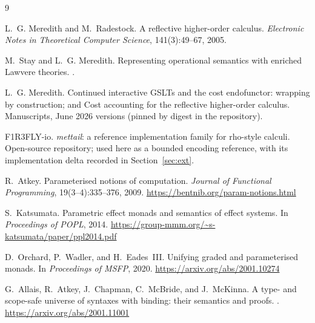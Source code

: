 \documentclass[11pt]{article}
\begin{document}
\begin{thebibliography}{9}

L.~G. Meredith and M.~Radestock.
\newblock A reflective higher-order calculus.
\newblock \emph{Electronic Notes in Theoretical Computer Science},
  141(3):49--67, 2005.

M.~Stay and L.~G. Meredith.
\newblock Representing operational semantics with enriched Lawvere
  theories.
.

L.~G. Meredith.
\newblock Continued interactive GSLTs and the cost endofunctor: wrapping
  by construction; and Cost accounting for the reflective higher-order
  calculus.
\newblock Manuscripts, June 2026 versions (pinned by digest in the
  repository).

F1R3FLY-io.
\newblock \emph{mettail}: a reference implementation family for
  rho-style calculi.
\newblock Open-source repository; used here as a bounded encoding
reference, with its implementation delta recorded in
Section~\ref{sec:ext}.

R.~Atkey.
\newblock Parameterised notions of computation.
\newblock \emph{Journal of Functional Programming}, 19(3--4):335--376,
  2009.
\newblock \url{https://bentnib.org/param-notions.html}

S.~Katsumata.
\newblock Parametric effect monads and semantics of effect systems.
\newblock In \emph{Proceedings of POPL}, 2014.
\newblock \url{https://group-mmm.org/~s-katsumata/paper/ppl2014.pdf}

D.~Orchard, P.~Wadler, and H.~Eades~III.
\newblock Unifying graded and parameterised monads.
\newblock In \emph{Proceedings of MSFP}, 2020.
\newblock \url{https://arxiv.org/abs/2001.10274}

G.~Allais, R.~Atkey, J.~Chapman, C.~McBride, and J.~McKinna.
\newblock A type- and scope-safe universe of syntaxes with binding: their
  semantics and proofs.
.
\newblock \url{https://arxiv.org/abs/2001.11001}

\end{thebibliography}
\end{document}
